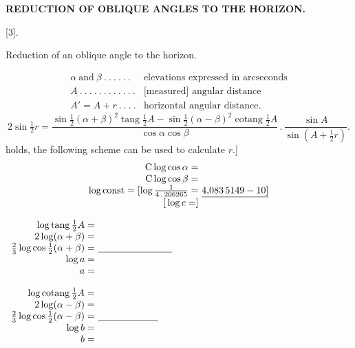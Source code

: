 \par\clearpage
\noindent\null\hfill{\small\textbf{REDUCTION OF OBLIQUE ANGLES TO THE HORIZON.}}\hfill{}\par\bigskip
\begin{center}[3].\par\medskip
{\large Reduction of an oblique angle to the horizon.}\end{center}
\noindent [Let]
\[
\begin{array}{ll}
\alpha\ \text{and}\ \beta\ .\ .\ .\ .\ .\ .&\text{elevations expressed in arcseconds}\\
A\ .\ .\ .\ .\ .\ .\ .\ .\ .\ .\ .\ .&\text{[measured] angular distance}\\
A'=A+r\ .\ .\ .\ .&\text{horizontal angular distance.}
\end{array}
\]
\noindent [Then]
\[
2\sin\tfrac12r=\frac{\sin\frac12(\alpha+\beta)^2\operatorname{tang}\frac12A-\sin\frac12(\alpha-\beta)^2\operatorname{cotang}\frac12A}{\cos\alpha\cos\beta}\,.\,\frac{\sin A}{\sin(A+\frac12r)}.
\]
\noindent [Since the approximation
\[
\sin\tfrac12u=\frac{u''}{2\,.\,206265}\sqrt[3]{\cos\tfrac12u}
\]
\noindent holds, the following scheme can be used to calculate $r$.]
\[
\begin{array}{r@{\ }l}
\mathrm C\log\cos\alpha=&\\
\mathrm C\log\cos\beta=&\\
\log\mathrm{const}=[\log\frac1{4\,.\,206265}=&\underline{4{,}083\,5149-10]}\\
{[}\log c=]&
\end{array}
\]
\noindent\begin{minipage}[t]{.49\linewidth}\centering
$\begin{array}{r@{\ }l}
\log\operatorname{tang}\tfrac12A=&\\
2\log(\alpha+\beta)=&\\
\tfrac23\log\cos\tfrac12(\alpha+\beta)=&\underline{\hspace{2.7cm}}\\
\log a=&\\
a=&
\end{array}$
\end{minipage}\hfill
\begin{minipage}[t]{.49\linewidth}\centering
$\begin{array}{r@{\ }l}
\log\operatorname{cotang}\tfrac12A=&\\
2\log(\alpha-\beta)=&\\
\tfrac23\log\cos\tfrac12(\alpha-\beta)=&\underline{\hspace{2.2cm}}\\
\log b=&\\
b=&
\end{array}$
\end{minipage}
